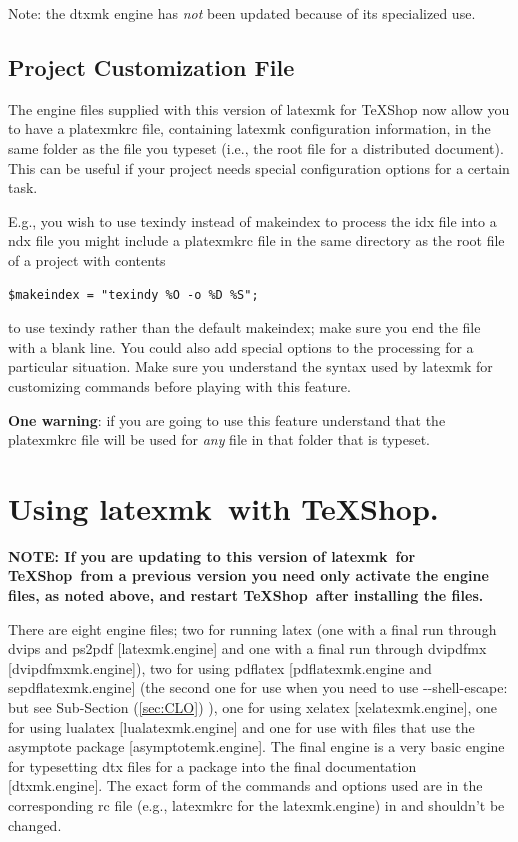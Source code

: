 \documentclass[11pt]{article}
\newcommand{\cmd}[1]{\textsf{#1}}
\newcommand{\TS}{\textsf{\TeX Shop}}
\newcommand{\latexmk}{\textsf{latexmk}}
\begin{document}
Note: the \cmd{dtxmk} engine has \emph{not} been updated because of its specialized use.

\subsection{Project Customization File}

The engine files supplied with this version of latexmk for TeXShop now allow you to have a \cmd{platexmkrc} file, containing \cmd{latexmk} configuration information, in the same folder as the file you typeset (i.e., the root file for a distributed document). This can be useful if your project needs special configuration options for a certain task.

E.g., you wish to use \cmd{texindy} instead of \cmd{makeindex} to process the \cmd{idx} file into a \cmd{ndx} file you might include a \cmd{platexmkrc} file in the same directory as the root file of a project with contents
\begin{verbatim}
$makeindex = "texindy %O -o %D %S";
\end{verbatim}
to use \cmd{texindy} rather than the default \cmd{makeindex}; make sure you end the file with a blank line. You could also add special options to the processing for a particular situation. Make sure you understand the syntax used by \cmd{latexmk} for customizing commands before playing with this feature.

\textbf{One warning}: if you are going to use this feature understand that the \cmd{platexmkrc} file will be used for \emph{any} file in that folder that is typeset.

\section{Using \latexmk\ with \TS.}

\textbf{NOTE: If you are updating to this version of \latexmk\ for \TS\ from a previous version you need only activate the engine files, as noted above, and restart \TS\ after installing the files.}

There are eight \cmd{engine} files; two for running \cmd{latex} (one with a final run through \cmd{dvips} and \cmd{ps2pdf} [\cmd{latexmk.engine}] and one with a final run through \cmd{dvipdfmx} [\cmd{dvipdfmxmk.engine]}), two for using \cmd{pdflatex} [\cmd{pdflatexmk.engine} and \cmd{sepdflatexmk.engine}] (the second one for use when you need to use \cmd{-{}-shell-escape}: but see Sub-Section (\ref{sec:CLO}) ), one for using \cmd{xelatex} [\cmd{xelatexmk.engine}], one for using \cmd{lualatex} [\cmd{lualatexmk.engine}] and one for use with files that use the \cmd{asymptote} package [\cmd{asymptotemk.engine}]. The final engine is a very basic engine for typesetting \cmd{dtx} files for a package into the final documentation [\cmd{dtxmk.engine}]. The exact form of the commands and options used are in the corresponding \cmd{rc} file (e.g., \cmd{latexmkrc} for the \cmd{latexmk.engine}) in  and shouldn't be changed.
\end{document}
